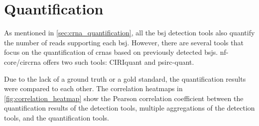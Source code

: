 \section{Quantification}

As mentioned in \cref{sec:crna_quantification}, all the \gls{bsj} detection
tools also quantify the number of reads supporting each \gls{bsj}.
However, there are several tools that focus on the quantification of
\gls{crna}s based on previously detected \gls{bsj}s.
nf-core/circrna offers two such tools: CIRIquant and psirc-quant.

Due to the lack of a ground truth or a gold standard, the quantification
results were compared to each other.
The correlation heatmaps in \cref{fig:correlation_heatmap} show the Pearson
correlation coefficient between the quantification results of the detection
tools, multiple aggregations of the detection tools, and the quantification
tools.

